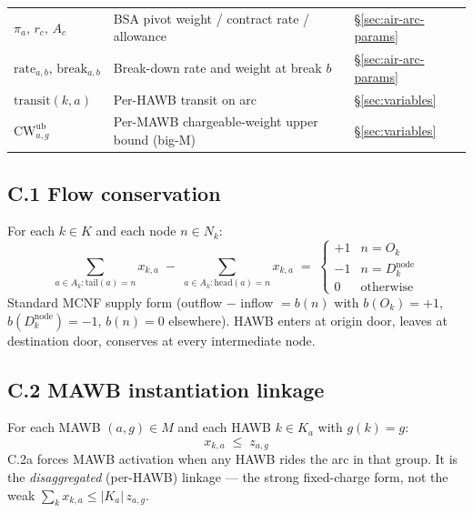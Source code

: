 \documentclass[11pt,a4paper]{article}
\theoremstyle{definition}
\begin{document}
\begin{table}[H]
\begin{tabular}{lp{9cm}p{3.5cm}}
$\pi_a,\, r_c,\, A_c$ & BSA pivot weight / contract rate / allowance & \S\ref{sec:air-arc-params} \\
$\text{rate}_{a,b},\, \text{break}_{a,b}$ & Break-down rate and weight at break $b$ & \S\ref{sec:air-arc-params} \\
$\text{transit}(k, a)$ & Per-HAWB transit on arc & \S\ref{sec:variables} \\
$\text{CW}^{\text{ub}}_{a,g}$ & Per-MAWB chargeable-weight upper bound (big-M) & \S\ref{sec:variables} \\
\bottomrule
\end{tabular}
\end{table}

\subsection*{C.1 Flow conservation }

For each $k \in K$ and each node $n \in N_k$:
\begin{equation}
  \sum_{a \in A_k : \text{tail}(a) = n} x_{k,a}
  \;-\;
  \sum_{a \in A_k : \text{head}(a) = n} x_{k,a}
  \;=\;
  \begin{cases}
    +1 & n = O_k \\
    -1 & n = D_k^{\text{node}} \\
    0  & \text{otherwise}
  \end{cases}
  \label{eq:C1}
\end{equation}
Standard MCNF supply form (outflow $-$ inflow $= b(n)$ with $b(O_k) = +1$,
$b(D_k^{\text{node}}) = -1$, $b(n) = 0$ elsewhere). HAWB enters at origin
door, leaves at destination door, conserves at every intermediate node.

\subsection*{C.2 MAWB instantiation linkage }

For each MAWB $(a, g) \in M$ and each HAWB $k \in K_a$ with $g(k) = g$:
\begin{equation}
  x_{k,a} \;\leq\; z_{a,g}
  \tag{C.2a} \label{eq:C2a}
\end{equation}
C.2a forces MAWB activation when any HAWB rides the arc in that group. It is the
\emph{disaggregated} (per-HAWB) linkage --- the strong fixed-charge form, not the weak
$\sum_k x_{k,a} \le |K_a|\, z_{a,g}$.
\end{document}
